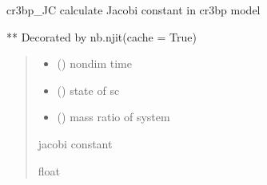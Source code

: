 \documentclass[letterpaper,10pt,english]{sphinxmanual}
\begin{document}
\begin{fulllineitems}
\label{\detokenize{models:pyraa.models.cr3bp_JC}}
\pysigstartsignatures
{}
\pysigstopsignatures
\sphinxAtStartPar
cr3bp\_JC \sphinxhyphen{} calculate Jacobi constant in cr3bp model

\sphinxAtStartPar
** Decorated by nb.njit(cache = True)
\begin{quote}\begin{description}
\begin{itemize}
\item {} 
\sphinxAtStartPar
{} () \sphinxhyphen{}\sphinxhyphen{} non\sphinxhyphen{}dim time

\item {} 
\sphinxAtStartPar
{} () \sphinxhyphen{}\sphinxhyphen{} state of sc

\item {} 
\sphinxAtStartPar
{} () \sphinxhyphen{}\sphinxhyphen{} mass ratio of system

\end{itemize}

\sphinxAtStartPar
{} \sphinxhyphen{}\sphinxhyphen{} jacobi constant

\sphinxAtStartPar
float

\end{description}\end{quote}

\end{fulllineitems}

\end{document}
